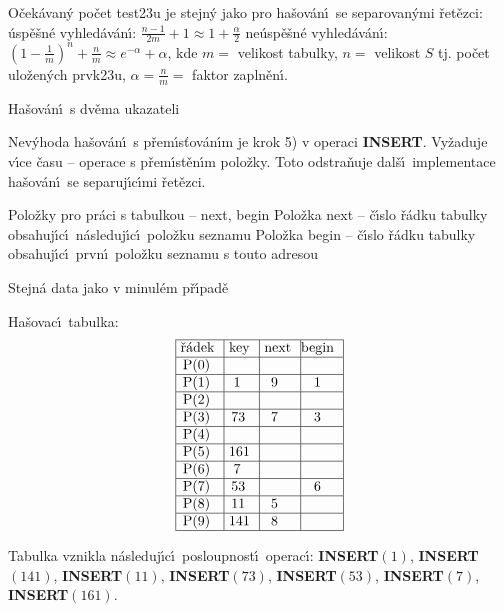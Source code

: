 \flushpar O\v cek\'avan\'y po\v cet test\accent23u je stejn\'y jako pro 
ha\v sov\'an\'\i\ se se\-pa\-ro\-va\-n\'y\-mi \v ret\v ezci:\newline 
\phantom{---}\'usp\v e\v sn\'e vyhled\'av\'an\'\i : $\frac {n-1}{2m}+1\approx 
1+\frac {\alpha}2$\newline 
\phantom{---}ne\'usp\v e\v sn\'e vyhled\'av\'an\'\i : $\left(1-\frac 1m\right)^n+\frac nm
\approx e^{-\alpha}+\alpha$,\newline 
kde $m=$ velikost tabulky, $n=$ velikost $S$ tj. po\v cet ulo\v zen\'ych 
prvk\accent23u, $\alpha =\frac nm=$ faktor zapln\v en\'\i.

\heading
Ha\v sov\'an\'\i\ s dv\v ema ukazateli
\endheading

\flushpar Nev\'yhoda ha\v sov\'an\'\i\ s p\v rem\'\i s\v tov\'an\'\i m je krok 5) v operaci 
{\bf INSERT}. Vy\v zaduje v\'\i ce \v casu -- operace s p\v rem\'\i st\v en\'\i m 
polo\v zky. Toto odstra\v nuje dal\v s\'\i\ implementace ha\v sov\'an\'\i\ se 
separuj\'\i c\'\i mi \v ret\v ezci.
\smallskip

\flushpar Polo\v zky pro pr\'aci s tabulkou -- next, 
begin\newline 
\phantom{---}Polo\v zka next -- \v c\'\i slo \v r\'adku tabulky obsahuj\'\i c\'\i\ 
n\'asleduj\'\i c\'\i\ polo\v z\-ku seznamu\newline 
\phantom{---}Polo\v zka begin -- \v c\'\i slo \v r\'adku tabulky obsahuj\'\i c\'\i\ prvn\'\i\ polo\v zku seznamu 
s touto adresou\newline 

\flushpar Stejn\'a data jako v minul\'em p\v r\'\i pad\v e\newline 

\flushpar Ha\v sovac\'\i\ tabulka:
$$\vtop{\offinterlineskip\halign {\strut\vrule\ # & \vrule\ # & \vrule\ # & \vrule \hfil # \hfil \vrule\cr\noalign{\hrule}\v r\'adek & key & next & begin \hfil \cr\noalign{\hrule}P(0) & & & \hfill \cr\noalign{\hrule}P(1) & 1 & 9 & 1 \cr\noalign{\hrule}P(2) & & & \hfill \cr\noalign{\hrule}P(3) & 73 & 7 & 3 \cr\noalign{\hrule}P(4) & & &\hfill \cr\noalign{\hrule}P(5) & 161 & & \hfill \cr\noalign{\hrule}P(6) & 7 & & \hfill \cr\noalign{\hrule}P(7) & 53 & & 6 \cr\noalign{\hrule}P(8) & 11 & 5 & \hfill \cr\noalign{\hrule}P(9) & 141 & 8 & \hfill \cr\noalign{\hrule}}}$$

\flushpar Tabulka vznikla n\'asleduj\'\i c\'\i\ posloupnost\'\i\ 
operac\'\i :\newline 
{\bf INSERT$\left(1\right)$}, {\bf INSERT$\left(141\right)$}, {\bf INSERT$\left(11\right)$}, {\bf INSERT$
\left(73\right)$}, 
{\bf INSERT$\left(53\right)$}, {\bf INSERT$\left(7\right)$}, {\bf INSERT$\left(161\right)$}. 
\medskip


